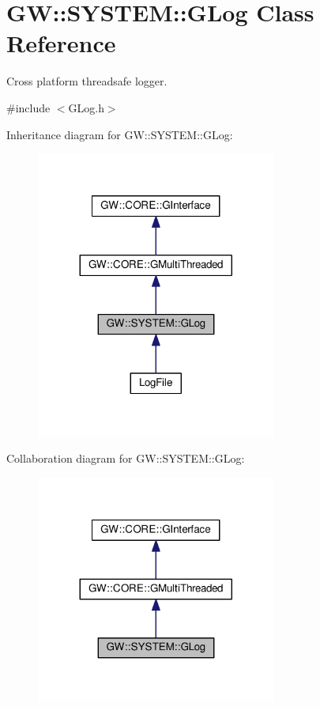\hypertarget{classGW_1_1SYSTEM_1_1GLog}{}\section{GW\+:\+:S\+Y\+S\+T\+EM\+:\+:G\+Log Class Reference}
\label{classGW_1_1SYSTEM_1_1GLog}


Cross platform threadsafe logger.  




{\ttfamily \#include $<$G\+Log.\+h$>$}



Inheritance diagram for GW\+:\+:S\+Y\+S\+T\+EM\+:\+:G\+Log\+:\nopagebreak
\begin{figure}[H]
\begin{center}
\leavevmode
\includegraphics[width=224pt]{classGW_1_1SYSTEM_1_1GLog__inherit__graph}
\end{center}
\end{figure}


Collaboration diagram for GW\+:\+:S\+Y\+S\+T\+EM\+:\+:G\+Log\+:\nopagebreak
\begin{figure}[H]
\begin{center}
\leavevmode
\includegraphics[width=224pt]{classGW_1_1SYSTEM_1_1GLog__coll__graph}
\end{center}
\end{figure}
